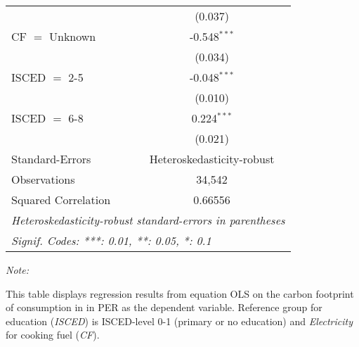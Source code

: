\begin{table}[htbp!]
\begin{adjustbox}{width = 1\textwidth, max height = 0.95\textheight, center}
\begin{threeparttable}[b]
\begin{tabular}{lc}
                                & (0.037)\\   
            CF $=$ Unknown      & -0.548$^{***}$\\   
                                & (0.034)\\   
            ISCED $=$ 2-5       & -0.048$^{***}$\\   
                                & (0.010)\\   
            ISCED $=$ 6-8       & 0.224$^{***}$\\   
                                & (0.021)\\   
            \midrule 
            Standard-Errors     & Heteroskedasticity-robust \\   
            Observations        & 34,542\\  
            Squared Correlation & 0.66556\\  
            \midrule \midrule
            \multicolumn{2}{l}{\emph{Heteroskedasticity-robust standard-errors in parentheses}}\\
            \multicolumn{2}{l}{\emph{Signif. Codes: ***: 0.01, **: 0.05, *: 0.1}}\\
         \end{tabular}
         
         \begin{tablenotes}\item \medskip \textit{Note:}
            \item This table displays regression results from equation OLS on the carbon footprint of consumption in  in PER as the dependent variable.  Reference group for education (\textit{ISCED}) is ISCED-level 0-1 (primary or no education) and \textit{Electricity} for cooking fuel (\textit{CF}).
         \end{tablenotes}
      \end{threeparttable}
   \end{adjustbox}
\end{table}


